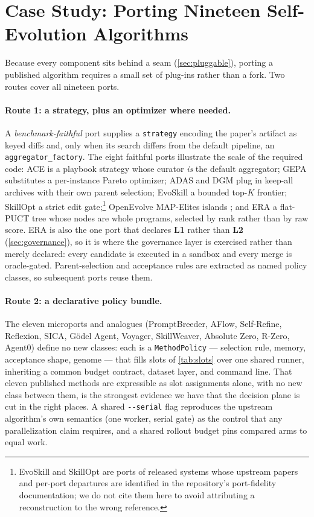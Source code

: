 \documentclass{article}
\newcommand{\code}[1]{\texttt{#1}}
\begin{document}
\section{Case Study: Porting Nineteen Self-Evolution Algorithms}
\label{sec:ports}

Because every component sits behind a seam (\cref{sec:pluggable}), porting a published algorithm requires a small set of plug-ins rather than a fork. Two routes cover all nineteen ports.

\paragraph{Route 1: a strategy, plus an optimizer where needed.} A \emph{benchmark-faithful} port supplies a \code{strategy} encoding the paper's artifact as keyed diffs and, only when its search differs from the default pipeline, an \code{aggregator\_factory}. The eight faithful ports illustrate the scale of the required code: ACE \citep{zhang2025ace} is a playbook strategy whose curator \emph{is} the default aggregator; GEPA \citep{agrawal2025gepa} substitutes a per-instance Pareto optimizer; ADAS \citep{hu2024adas} and DGM \citep{zhang2025dgm} plug in keep-all archives with their own parent selection; EvoSkill a bounded top-$K$ frontier; SkillOpt a strict edit gate;\footnote{EvoSkill and SkillOpt are ports of released systems whose upstream papers and per-port departures are identified in the repository's port-fidelity documentation; we do not cite them here to avoid attributing a reconstruction to the wrong reference.} OpenEvolve \citep{openevolve2025} MAP-Elites islands \citep{mouret2015mapelites}; and ERA \citep{aygun2025era} a flat-PUCT tree whose nodes are whole programs, selected by rank rather than by raw score. ERA is also the one port that declares \textbf{L1} rather than \textbf{L2} (\cref{sec:governance}), so it is where the governance layer is exercised rather than merely declared: every candidate is executed in a sandbox and every merge is oracle-gated. Parent-selection and acceptance rules are extracted as named policy classes, so subsequent ports reuse them.

\paragraph{Route 2: a declarative policy bundle.} The eleven microports and analogues (PromptBreeder, AFlow, Self-Refine, Reflexion, SICA, G\"odel Agent, Voyager, SkillWeaver, Absolute Zero, R-Zero, Agent0) define no new classes: each is a \code{MethodPolicy} --- selection rule, memory, acceptance shape, genome --- that fills slots of \cref{tab:slots} over one shared runner, inheriting a common budget contract, dataset layer, and command line. That eleven published methods are expressible as slot assignments alone, with no new class between them, is the strongest evidence we have that the decision plane is cut in the right places. A shared \code{-{}-serial} flag reproduces the upstream algorithm's own semantics (one worker, serial gate) as the control that any parallelization claim requires, and a shared rollout budget pins compared arms to equal work.
\end{document}

